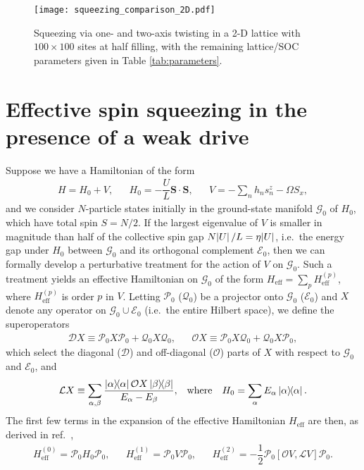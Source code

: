 \documentclass[aps,notitlepage,nofootinbib,11pt]{revtex4-1}
\renewcommand{\t}{\text} %
\newcommand{\f}[2]{\dfrac{#1}{#2}} %
\renewcommand{\sp}[1]{\left[#1\right]} %
\renewcommand{\v}{\bm} %
\renewcommand{\c}{\cdot} %
\newcommand{\D}{\mathcal{D}}
\newcommand{\E}{\mathcal{E}}
\newcommand{\G}{\mathcal{G}}
\renewcommand{\L}{\mathcal{L}}
\renewcommand{\O}{\mathcal{O}}
\renewcommand{\P}{\mathcal{P}}
\newcommand{\Q}{\mathcal{Q}}
\newcommand{\1}{\mathds{1}}
\begin{document}
\begin{figure}
  \centering
  \texttt{[image: squeezing\_comparison\_2D.pdf]}
  \caption{Squeezing via one- and two-axis twisting in a 2-D lattice
    with $100\times100$ sites at half filling, with the remaining
    lattice/SOC parameters given in Table \ref{tab:parameters}.}
  \label{fig:squeezing_comparison_2D}
\end{figure}


\newpage
\appendix

\section{Effective spin squeezing in the presence of a weak drive}
\label{sec:squeezing_derivation}

Suppose we have a Hamiltonian of the form
\begin{align}
  H = H_0 + V,
  &&
  H_0 = - \f{U}{L} \v S\c\v S,
  &&
  V = - \sum_n h_n s_n^z - \Omega S_x,
\end{align}
and we consider $N$-particle states initially in the ground-state
manifold $\G_0$ of $H_0$, which have total spin $S=N/2$.  If the
largest eigenvalue of $V$ is smaller in magnitude than half of the
collective spin gap $N\abs{U}/L=\eta\abs{U}$, i.e.~the energy gap
under $H_0$ between $\G_0$ and its orthogonal complement $\E_0$, then
we can formally develop a perturbative treatment for the action of $V$
on $\G_0$.  Such a treatment yields an effective Hamiltonian on $\G_0$
of the form $H_{\t{eff}}=\sum_pH_{\t{eff}}^{(p)}$, where
$H_{\t{eff}}^{(p)}$ is order $p$ in $V$.  Letting $\P_0$ ($\Q_0$) be a
projector onto $\G_0$ ($\E_0$) and $X$ denote any operator on
$\G_0\cup\E_0$ (i.e.~the entire Hilbert space), we define the
superoperators
\begin{align}
  \D X \equiv \P_0 X \P_0 + \Q_0 X \Q_0,
  &&
  \O X \equiv \P_0 X \Q_0 + \Q_0 X \P_0,
\end{align}
which select the diagonal ($\D$) and off-diagonal ($\O$) parts of $X$
with respect to $\G_0$ and $\E_0$, and
\begin{align}
  \L X \equiv \sum_{\alpha,\beta}
  \f{\op{\alpha}\O X\op{\beta}}{E_\alpha-E_\beta},
  &&
  \t{where}
  &&
  H_0 = \sum_\alpha E_\alpha \op\alpha.
\end{align}
The first few terms in the expansion of the effective Hamiltonian
$H_{\t{eff}}$ are then, as derived in
ref.~\cite{bravyi2011schrieffer},
\begin{align}
  H_{\t{eff}}^{(0)} = \P_0 H_0 \P_0,
  &&
  H_{\t{eff}}^{(1)} = \P_0 V \P_0,
  &&
  H_{\t{eff}}^{(2)} = -\f12 \P_0 \sp{\O V,\L V} \P_0.
  \label{eq:H_eff_012}
\end{align}
\end{document}
